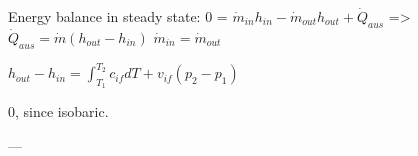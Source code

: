 Energy balance in steady state:  
0 = \( \dot{m}_{in} h_{in} - \dot{m}_{out} h_{out} + \dot{Q}_{aus} \)  
=> \( \dot{Q}_{aus} = \dot{m} (h_{out} - h_{in}) \)  
\( \dot{m}_{in} = \dot{m}_{out} \)  

\( h_{out} - h_{in} = \int_{T_1}^{T_2} c_{if} dT + v_{if} (p_2 - p_1) \)  

0, since isobaric.  

---
